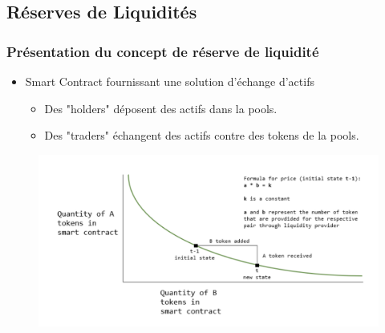 \subsection{Réserves de Liquidités}

\begin{frame}
    \frametitle{Présentation du concept de réserve de liquidité}
    \begin{itemize}
        \item Smart Contract fournissant une solution d'échange d'actifs
        \begin{itemize}
            \item Des "holders" déposent des actifs dans la pools.
            \item Des "traders" échangent des actifs contre des tokens de la pools.
        \end{itemize}
    \end{itemize}    
    \begin{figure}
        \centering
        \includegraphics[scale = 0.22]{decentralisation/reserve_liquidite.png}
    \end{figure}
\end{frame}



